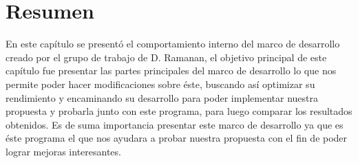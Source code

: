 \section{Resumen}\label{sec:summaryIV}

En este capítulo se presentó el comportamiento interno del marco de desarrollo creado por el grupo de trabajo de D. Ramanan, el objetivo principal de este capítulo fue presentar las partes principales del marco de desarrollo lo que nos permite poder hacer modificaciones sobre éste, buscando así optimizar su rendimiento y encaminando su desarrollo para poder implementar nuestra propuesta y probarla junto con este programa, para luego comparar los resultados obtenidos. Es de suma importancia presentar este marco de desarrollo ya que es éste programa el que nos ayudara a probar nuestra propuesta con el fin de poder lograr mejoras interesantes.